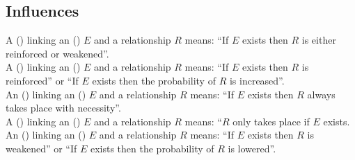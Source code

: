 
\subsection{Influences}

A  () linking an  () $E$  and a relationship $R$ means: ``If $E$ exists then $R$ is either reinforced or weakened''. 
\\[\baselineskip]

\noindent
A  () linking an  () $E$ and a relationship $R$ means: ``If $E$ exists then $R$ is reinforced'' or ``If $E$ exists then the probability of $R$ is increased''. 
\\[\baselineskip]

\noindent
An  () linking an  () $E$ and a relationship $R$ means: ``If $E$ exists then $R$ always takes place with necessity''. 
\\[\baselineskip]

\noindent
A  () linking an  () $E$ and a relationship $R$ means: ``$R$ only takes place if $E$ exists. 
\\[\baselineskip]

\noindent
An  () linking an  () $E$ and a relationship $R$ means: ``If $E$ exists then $R$ is weakened'' or ``If $E$ exists then the probability of $R$ is lowered''. 
\\[\baselineskip]

